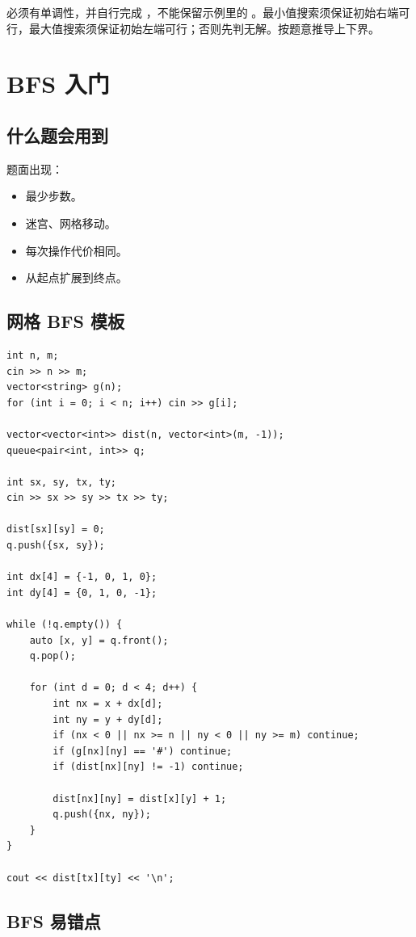 必须有单调性，并自行完成 ，不能保留示例里的 。最小值搜索须保证初始右端可行，最大值搜索须保证初始左端可行；否则先判无解。按题意推导上下界。

\section{BFS 入门}\label{sec:06-18}

\subsection{什么题会用到}

题面出现：

\begin{itemize}
  \item 最少步数。
  \item 迷宫、网格移动。
  \item 每次操作代价相同。
  \item 从起点扩展到终点。
\end{itemize}

\subsection{网格 BFS 模板}

\begin{lstlisting}
int n, m;
cin >> n >> m;
vector<string> g(n);
for (int i = 0; i < n; i++) cin >> g[i];

vector<vector<int>> dist(n, vector<int>(m, -1));
queue<pair<int, int>> q;

int sx, sy, tx, ty;
cin >> sx >> sy >> tx >> ty;

dist[sx][sy] = 0;
q.push({sx, sy});

int dx[4] = {-1, 0, 1, 0};
int dy[4] = {0, 1, 0, -1};

while (!q.empty()) {
    auto [x, y] = q.front();
    q.pop();

    for (int d = 0; d < 4; d++) {
        int nx = x + dx[d];
        int ny = y + dy[d];
        if (nx < 0 || nx >= n || ny < 0 || ny >= m) continue;
        if (g[nx][ny] == '#') continue;
        if (dist[nx][ny] != -1) continue;

        dist[nx][ny] = dist[x][y] + 1;
        q.push({nx, ny});
    }
}

cout << dist[tx][ty] << '\n';
\end{lstlisting}

\subsection{BFS 易错点}

